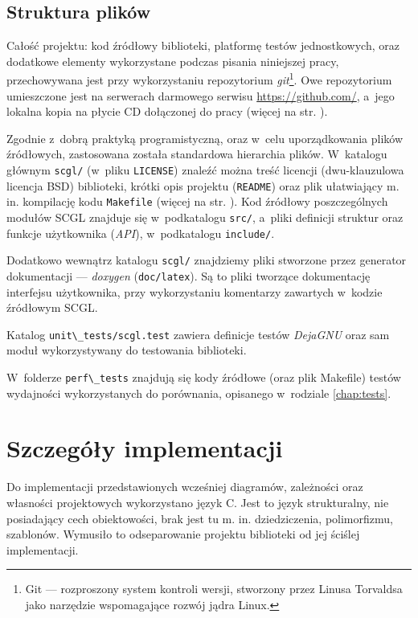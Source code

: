\documentclass[a4paper,12pt,polish,twoside,openright]{thesis}
\newcommand\code[1]{\lstinline[style=line]{#1}}
\begin{document}
\subsection{Struktura plików}
Całość projektu: kod źródłowy biblioteki, platformę testów jednostkowych, oraz dodatkowe elementy wykorzystane podczas pisania niniejszej pracy, przechowywana jest przy wykorzystaniu repozytorium \emph{git}\footnote{Git --- rozproszony system kontroli wersji, stworzony przez Linusa Torvaldsa jako narzędzie wspomagające rozwój jądra Linux.}.
Owe repozytorium umieszczone jest na serwerach darmowego serwisu \url{https://github.com/}, a~jego lokalna kopia na płycie CD dołączonej do pracy (więcej na str. \pageref{chap:cd}).

Zgodnie z~dobrą praktyką programistyczną, oraz w~celu uporządkowania plików źródłowych, zastosowana została standardowa hierarchia plików.
W~katalogu głównym \code{scgl/} (w~pliku \code{LICENSE}) znaleźć można treść licencji (dwu-klauzulowa licencja BSD) biblioteki, krótki opis projektu (\code{README}) oraz plik ułatwiający m. in. kompilację kodu \code{Makefile} (więcej na str. \pageref{chap:make}).
Kod źródłowy poszczególnych modułów SCGL znajduje się w~podkatalogu \code{src/}, a~pliki definicji struktur oraz funkcje użytkownika (\emph{API}), w~podkatalogu \code{include/}.

Dodatkowo wewnątrz katalogu \code{scgl/} znajdziemy pliki stworzone przez generator dokumentacji ---  \emph{doxygen} (\code{doc/latex}).
Są to pliki tworzące dokumentację interfejsu użytkownika, przy wykorzystaniu komentarzy zawartych w~kodzie źródłowym SCGL.

Katalog \code{unit\_tests/scgl.test} zawiera definicje testów \emph{DejaGNU} oraz sam moduł wykorzystywany do testowania biblioteki.

W~folderze \code{perf\_tests} znajdują się kody źródłowe (oraz plik Makefile) testów wydajności wykorzystanych do porównania, opisanego w~rodziale \ref{chap:tests}.


\section{Szczegóły implementacji}
Do implementacji przedstawionych wcześniej diagramów, zależności oraz własności projektowych wykorzystano język C.
Jest to język strukturalny, nie posiadający cech obiektowości, brak jest tu m. in. dziedziczenia, polimorfizmu, szablonów.
Wymusiło to odseparowanie projektu biblioteki od jej ściślej implementacji.
\end{document}
